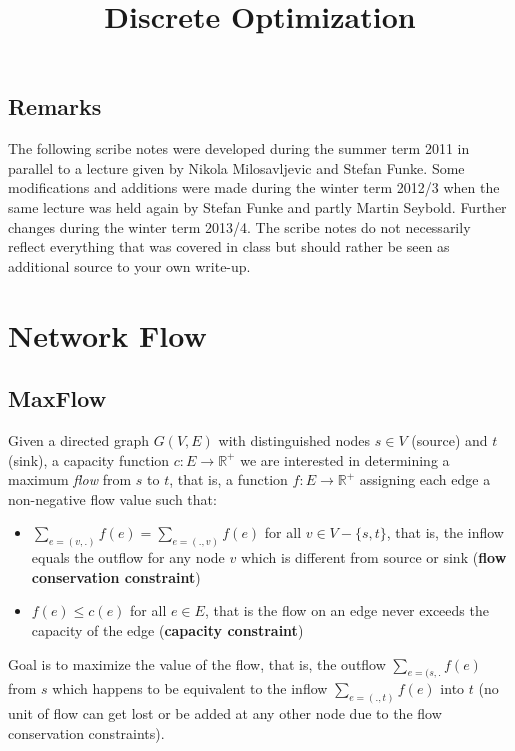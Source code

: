 \documentclass{article}
\begin{document}
\title{Discrete Optimization}
\maketitle

\tableofcontents
\newpage

\vfill
\subsection*{Remarks}
The following scribe notes were developed during the summer term 2011
in parallel to a lecture given by Nikola Milosavljevic and Stefan Funke.
Some modifications and additions were made during the winter term 2012/3 when the
same lecture was held again by Stefan Funke and partly Martin Seybold. Further
changes during the winter term 2013/4. 
The scribe notes do not necessarily reflect everything that was covered in class
but should rather be seen as additional source to your own write-up.


\newpage

\section{Network Flow}
\subsection{MaxFlow}
Given a directed graph $G(V,E)$ with distinguished nodes $s\in V$ (source) and $t$ (sink), a capacity function $c:E\rightarrow \mathbb{R}^+$ we are interested in determining a maximum \emph{flow} from $s$ to $t$, that is, a function $f:E\rightarrow \mathbb{R}^+$ assigning each edge a
non-negative flow value such that:
\begin{itemize}
\item $\displaystyle \sum_{e=(v,.)} f(e)=\sum_{e=(.,v)} f(e)$ for all $v\in V-\{s,t\}$, that is, the inflow equals the outflow for any node $v$ which is different from source or sink ({\bf flow conservation constraint})
\item $f(e)\leq c(e)$ for all $e\in E$, that is the flow on an edge never exceeds the capacity of the edge ({\bf capacity constraint})
\end{itemize}

Goal is to maximize the value of the flow, that is, the outflow $\sum_{e=(s,.}f(e)$ from $s$ which happens to be equivalent to the inflow $\sum_{e=(.,t)} f(e)$ into $t$ (no unit of flow can get lost or be added at any other node due to the flow conservation constraints).
\end{document}
